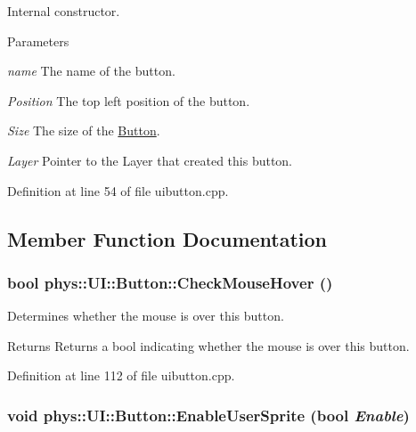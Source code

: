 Internal constructor. 


\begin{DoxyParams}{Parameters}
\item[{\em name}]The name of the button. \item[{\em Position}]The top left position of the button. \item[{\em Size}]The size of the \hyperlink{classphys_1_1UI_1_1Button}{Button}. \item[{\em Layer}]Pointer to the Layer that created this button. \end{DoxyParams}


Definition at line 54 of file uibutton.cpp.



\subsection{Member Function Documentation}
\hypertarget{classphys_1_1UI_1_1Button_a72d76501d15053e3fbd9e7eb933e22de}{
\subsubsection[{CheckMouseHover}]{\setlength{\rightskip}{0pt plus 5cm}bool phys::UI::Button::CheckMouseHover ()}}
\label{d8/d88/classphys_1_1UI_1_1Button_a72d76501d15053e3fbd9e7eb933e22de}


Determines whether the mouse is over this button. 

\begin{DoxyReturn}{Returns}
Returns a bool indicating whether the mouse is over this button. 
\end{DoxyReturn}


Definition at line 112 of file uibutton.cpp.

\hypertarget{classphys_1_1UI_1_1Button_a4fe6560484f1d78b08c96eaf967404d2}{
\subsubsection[{EnableUserSprite}]{\setlength{\rightskip}{0pt plus 5cm}void phys::UI::Button::EnableUserSprite (bool {\em Enable})}}
\label{d8/d88/classphys_1_1UI_1_1Button_a4fe6560484f1d78b08c96eaf967404d2}


